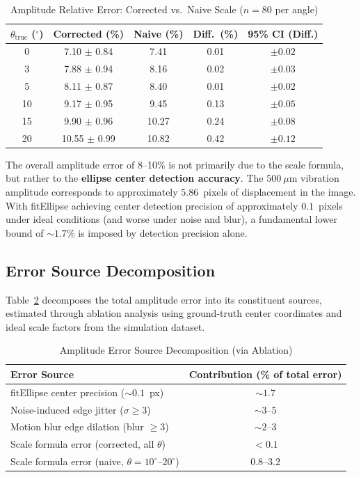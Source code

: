 \documentclass[journal]{IEEEtran}
\begin{document}
\begin{table}[!t]
\centering
\caption{Amplitude Relative Error: Corrected vs.\ Naive Scale ($n=80$ per angle)}
\label{tab:amplitude}
\begin{tabular}{ccccc}
\toprule
$\theta_{\text{true}}$ ($^{\circ}$) & Corrected (\%) & Naive (\%) & Diff.\ (\%) & 95\% CI (Diff.) \\
\midrule
0   & 7.10 $\pm$ 0.84 & 7.41 & 0.01 & $\pm 0.02$ \\
3   & 7.88 $\pm$ 0.94 & 8.16 & 0.02 & $\pm 0.03$ \\
5   & 8.11 $\pm$ 0.87 & 8.40 & 0.01 & $\pm 0.02$ \\
10  & 9.17 $\pm$ 0.95 & 9.45 & 0.13 & $\pm 0.05$ \\
15  & 9.90 $\pm$ 0.96 & 10.27 & 0.24 & $\pm 0.08$ \\
20  & 10.55 $\pm$ 0.99 & 10.82 & 0.42 & $\pm 0.12$ \\
\bottomrule
\end{tabular}
\end{table}

The overall amplitude error of 8--10\% is not primarily due to the scale
formula, but rather to the \textbf{ellipse center detection accuracy}. The
$500~\mu\text{m}$ vibration amplitude corresponds to approximately $5.86$~pixels
of displacement in the image. With fitEllipse achieving center detection
precision of approximately $0.1$~pixels under ideal conditions (and worse
under noise and blur), a fundamental lower bound of $\sim 1.7\%$ is imposed
by detection precision alone.

\subsection{Error Source Decomposition}

Table~\ref{tab:error_src} decomposes the total amplitude error into its
constituent sources, estimated through ablation analysis using ground-truth
center coordinates and ideal scale factors from the simulation dataset.

\begin{table}[!t]
\centering
\caption{Amplitude Error Source Decomposition (via Ablation)}
\label{tab:error_src}
\begin{tabular}{lc}
\toprule
Error Source & Contribution (\% of total error) \\
\midrule
fitEllipse center precision ($\sim 0.1$~px) & $\sim 1.7$ \\
Noise-induced edge jitter ($\sigma \geq 3$) & $\sim 3$--$5$ \\
Motion blur edge dilation (blur $\geq 3$) & $\sim 2$--$3$ \\
Scale formula error (corrected, all $\theta$) & $< 0.1$ \\
Scale formula error (naive, $\theta = 10^{\circ}$--$20^{\circ}$) & $0.8$--$3.2$ \\
\bottomrule
\end{tabular}
\end{table}
\end{document}
